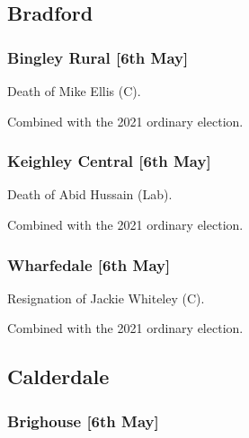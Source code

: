 \documentclass[a4paper,openany]{book}
\begin{document}
\begin{resultsiii}
\subsection*{Bradford}

\subsubsection*{Bingley Rural \hspace*{\fill}\nolinebreak[1]%
	\enspace\hspace*{\fill}
	[6th May]}


Death of Mike Ellis (C).

Combined with the 2021 ordinary election.

\subsubsection*{Keighley Central \hspace*{\fill}\nolinebreak[1]%
	\enspace\hspace*{\fill}
	[6th May]}


Death of Abid Hussain (Lab).

Combined with the 2021 ordinary election.

\subsubsection*{Wharfedale \hspace*{\fill}\nolinebreak[1]%
	\enspace\hspace*{\fill}
	[6th May]}


Resignation of Jackie Whiteley (C).

Combined with the 2021 ordinary election.

\subsection*{Calderdale}

\subsubsection*{Brighouse \hspace*{\fill}\nolinebreak[1]%
	\enspace\hspace*{\fill}
	[6th May]}


\end{resultsiii}
\end{document}
